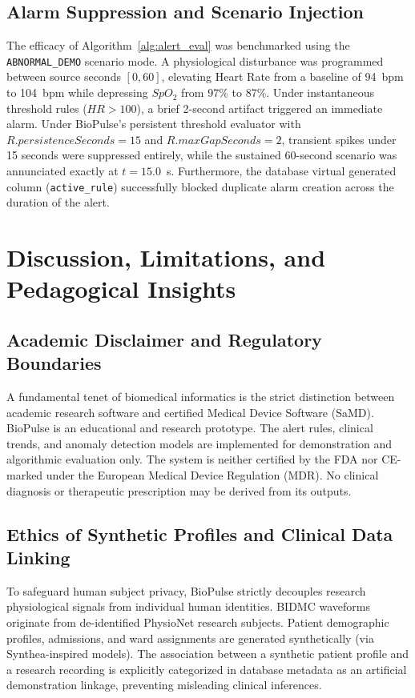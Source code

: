 \documentclass[10pt,journal,compsoc]{IEEEtran}
\begin{document}
\subsection{Alarm Suppression and Scenario Injection}
The efficacy of Algorithm~\ref{alg:alert_eval} was benchmarked using the \texttt{ABNORMAL\_DEMO} scenario mode. A physiological disturbance was programmed between source seconds $[0, 60]$, elevating Heart Rate from a baseline of 94~bpm to 104~bpm while depressing $SpO_2$ from 97\% to 87\%. 
Under instantaneous threshold rules ($HR > 100$), a brief 2-second artifact triggered an immediate alarm. Under BioPulse's persistent threshold evaluator with $R.persistenceSeconds = 15$ and $R.maxGapSeconds = 2$, transient spikes under 15 seconds were suppressed entirely, while the sustained 60-second scenario was annunciated exactly at $t = 15.0$~s. Furthermore, the database virtual generated column (\texttt{active\_rule}) successfully blocked duplicate alarm creation across the duration of the alert.

\section{Discussion, Limitations, and Pedagogical Insights}
\label{sec:discussion}

\subsection{Academic Disclaimer and Regulatory Boundaries}
A fundamental tenet of biomedical informatics is the strict distinction between academic research software and certified Medical Device Software (SaMD). BioPulse is an educational and research prototype. The alert rules, clinical trends, and anomaly detection models are implemented for demonstration and algorithmic evaluation only. The system is neither certified by the FDA nor CE-marked under the European Medical Device Regulation (MDR). No clinical diagnosis or therapeutic prescription may be derived from its outputs.

\subsection{Ethics of Synthetic Profiles and Clinical Data Linking}
To safeguard human subject privacy, BioPulse strictly decouples research physiological signals from individual human identities. BIDMC waveforms originate from de-identified PhysioNet research subjects. Patient demographic profiles, admissions, and ward assignments are generated synthetically (via Synthea-inspired models). The association between a synthetic patient profile and a research recording is explicitly categorized in database metadata as an artificial demonstration linkage, preventing misleading clinical inferences.
\end{document}
